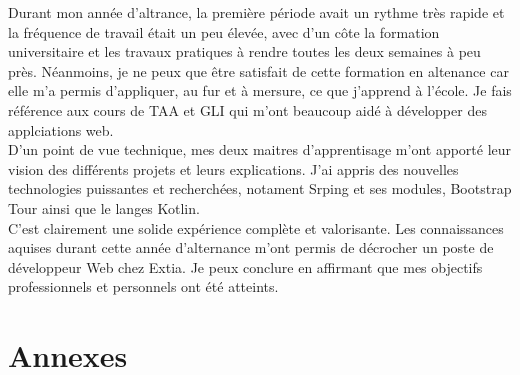 \documentclass[12pt]{article}
\begin{document}
Durant mon année d'altrance, la première période avait un rythme très rapide et la fréquence de travail était un peu élevée, avec d'un côte la formation universitaire et les travaux pratiques à rendre toutes les deux semaines à peu près. Néanmoins, je ne peux que être satisfait de cette formation en altenance car elle m'a permis d'appliquer, au fur et à mersure, ce que j'apprend à l'école. Je fais référence aux cours de TAA et GLI qui m'ont beaucoup aidé à développer des applciations web. \\

D'un point de vue technique, mes deux maitres d'apprentisage m'ont apporté leur vision des différents projets et leurs explications. J'ai appris des nouvelles technologies puissantes et recherchées, notament Srping et ses modules, Bootstrap Tour ainsi que le langes Kotlin. \\

C'est clairement une solide expérience complète et valorisante. Les connaissances aquises durant cette année d'alternance m'ont permis de décrocher un poste de développeur Web chez Extia. Je peux conclure en affirmant que mes objectifs professionnels et personnels ont été atteints. 
	

\newpage
\section{Annexes}
\end{document}
